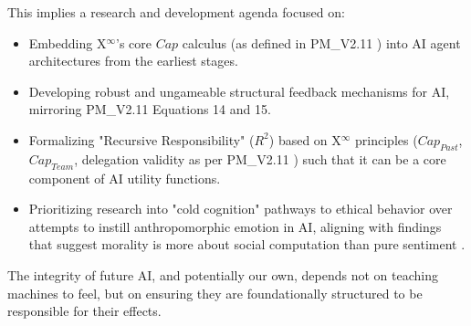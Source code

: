 \documentclass[11pt]{article}
\begin{document}
This implies a research and development agenda focused on:
\begin{itemize}
    \item Embedding X$^\infty$'s core $Cap$ calculus (as defined in PM\_V2.11 \cite{XInfinityPM}) into AI agent architectures from the earliest stages.
    \item Developing robust and ungameable structural feedback mechanisms for AI, mirroring PM\_V2.11 Equations 14 and 15.
    \item Formalizing "Recursive Responsibility" ($R^2$) based on X$^\infty$ principles ($Cap_{Past}$, $Cap_{Team}$, delegation validity as per PM\_V2.11 \cite{XInfinityPM}) such that it can be a core component of AI utility functions.
    \item Prioritizing research into "cold cognition" pathways to ethical behavior over attempts to instill anthropomorphic emotion in AI, aligning with findings that suggest morality is more about social computation than pure sentiment \cite{Greene2013, Churchland2011}.
\end{itemize}
The integrity of future AI, and potentially our own, depends not on teaching machines to feel, but on ensuring they are foundationally structured to be responsible for their effects.

\clearpage
\end{document}
